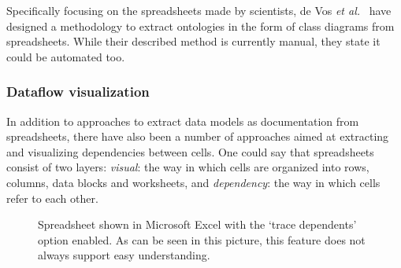 \documentclass[conference]{IEEEtran}
\begin{document}
Specifically focusing on the spreadsheets made by scientists, de Vos \emph{et al.}~\cite{vos_g.:_2012} have designed a methodology to extract ontologies in the form of class diagrams from spreadsheets. While their described method is currently manual, they state it could be automated too. 


\subsubsection{Dataflow visualization}
In addition to approaches to extract data models as documentation from spreadsheets, there have also been a number of approaches aimed at extracting and visualizing dependencies between cells. One could say that spreadsheets consist of two layers: \emph{visual}: the way in which cells are organized into rows, columns, data blocks and worksheets, and \emph{dependency}: the way in which cells refer to each other.

\begin{figure}
	\centering
	\setlength{\fboxsep}{0pt}
	\setlength{\fboxrule}{1pt}
	\caption{Spreadsheet shown in Microsoft Excel with the `trace dependents' option enabled. As can be seen in this picture, this feature does not always support easy understanding.}
	\label{fig:ComplexDependence}
\end{figure}
\end{document}
